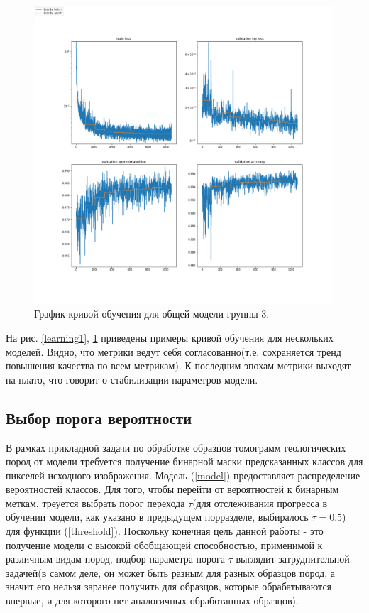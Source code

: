 \documentclass[12pt, a4paper]{extarticle}
\begin{document}
\begin{figure}[h!]
\includegraphics[width=0.99\textwidth]{data/images/learning_progress_SoilB-2_Urna_22_carb96558.png}
\caption{График кривой обучения для общей модели группы 3.}
\label{learning2}
\end{figure}

На рис. \ref{learning1}, \ref{learning2} приведены примеры кривой обучения для нескольких моделей. Видно, что метрики ведут себя согласованно(т.е. сохраняется тренд повышения качества по всем метрикам). К последним эпохам метрики выходят на плато, что говорит о стабилизации параметров модели.

\subsection{Выбор порога вероятности} 

В рамках прикладной задачи по обработке образцов томограмм геологических пород от модели требуется получение бинарной маски предсказанных классов для пикселей исходного изображения. Модель 
(\ref{model}) предоставляет распределение вероятностей классов. Для того, чтобы перейти от вероятностей к бинарным меткам, треуется выбрать порог перехода $\tau$(для отслеживания прогресса в обучении модели, как указано в предыдущем порразделе, выбиралось $\tau=0.5$) для функции (\ref{threshold}).
Поскольку конечная цель данной работы - это получение модели с высокой обобщающей способностью, применимой к различным видам пород, подбор параметра порога $\tau$ выглядит затруднительной задачей(в самом деле, он может быть разным для разных образцов пород, а значит его нельзя заранее получить для образцов, которые обрабатываются впервые, и для которого нет аналогичных обработанных образцов).
\end{document}
